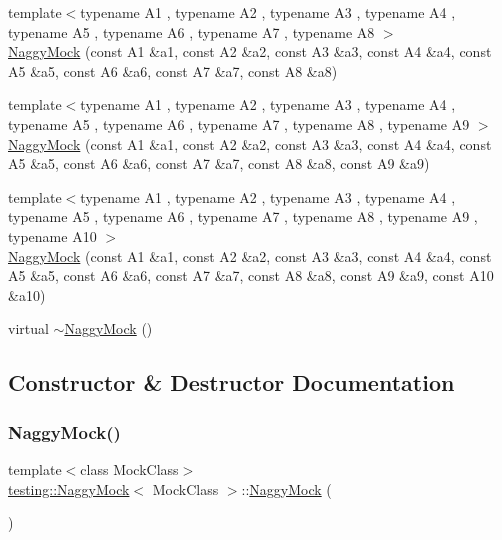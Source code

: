 \begin{DoxyCompactItemize}
\item 
{\footnotesize template$<$typename A1 , typename A2 , typename A3 , typename A4 , typename A5 , typename A6 , typename A7 , typename A8 $>$ }\\\hyperlink{classtesting_1_1_naggy_mock_a63b30506f56b792ffbdc5792a9630d5e}{Naggy\+Mock} (const A1 \&a1, const A2 \&a2, const A3 \&a3, const A4 \&a4, const A5 \&a5, const A6 \&a6, const A7 \&a7, const A8 \&a8)
\item 
{\footnotesize template$<$typename A1 , typename A2 , typename A3 , typename A4 , typename A5 , typename A6 , typename A7 , typename A8 , typename A9 $>$ }\\\hyperlink{classtesting_1_1_naggy_mock_a786f31ade7b8b9f6e78e07f51cc0e14b}{Naggy\+Mock} (const A1 \&a1, const A2 \&a2, const A3 \&a3, const A4 \&a4, const A5 \&a5, const A6 \&a6, const A7 \&a7, const A8 \&a8, const A9 \&a9)
\item 
{\footnotesize template$<$typename A1 , typename A2 , typename A3 , typename A4 , typename A5 , typename A6 , typename A7 , typename A8 , typename A9 , typename A10 $>$ }\\\hyperlink{classtesting_1_1_naggy_mock_aa40a39806b939f423696f9380de3172b}{Naggy\+Mock} (const A1 \&a1, const A2 \&a2, const A3 \&a3, const A4 \&a4, const A5 \&a5, const A6 \&a6, const A7 \&a7, const A8 \&a8, const A9 \&a9, const A10 \&a10)
\item 
virtual \hyperlink{classtesting_1_1_naggy_mock_a4d314aa583c985502eaec875440394ca}{$\sim$\+Naggy\+Mock} ()
\end{DoxyCompactItemize}


\subsection{Constructor \& Destructor Documentation}
\mbox{\label{classtesting_1_1_naggy_mock_acb769f78b93eb60b04db21250f416f70}} 
\subsubsection{\texorpdfstring{Naggy\+Mock()}{NaggyMock()}\hspace{0.1cm}{\footnotesize\ttfamily [1/11]}}
{\footnotesize\ttfamily template$<$class Mock\+Class$>$ \\
\hyperlink{classtesting_1_1_naggy_mock}{testing\+::\+Naggy\+Mock}$<$ Mock\+Class $>$\+::\hyperlink{classtesting_1_1_naggy_mock}{Naggy\+Mock} (\begin{DoxyParamCaption}{ }\end{DoxyParamCaption})\hspace{0.3cm}{\ttfamily [inline]}}

